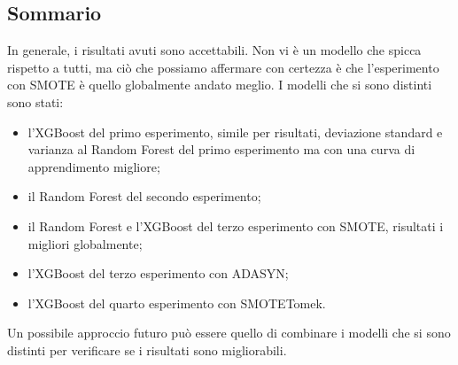 \subsection{Sommario}
\noindent In generale, i risultati avuti sono accettabili. Non vi è un modello che spicca rispetto a tutti, ma ciò che possiamo affermare con certezza è che l'esperimento con SMOTE è quello globalmente andato meglio. I modelli che si sono distinti sono stati: 
\begin{itemize}[label=-]
    \item l'XGBoost del primo esperimento, simile per risultati, deviazione standard e varianza al Random Forest del primo esperimento ma con una curva di apprendimento migliore;
    \item il Random Forest del secondo esperimento;
    \item il Random Forest e l'XGBoost del terzo esperimento con SMOTE, risultati i migliori globalmente;
    \item l'XGBoost del terzo esperimento con ADASYN;
    \item l'XGBoost del quarto esperimento con SMOTETomek.
\end{itemize}

\noindent Un possibile approccio futuro può essere quello di combinare i modelli che si sono distinti per verificare se i risultati sono migliorabili.
